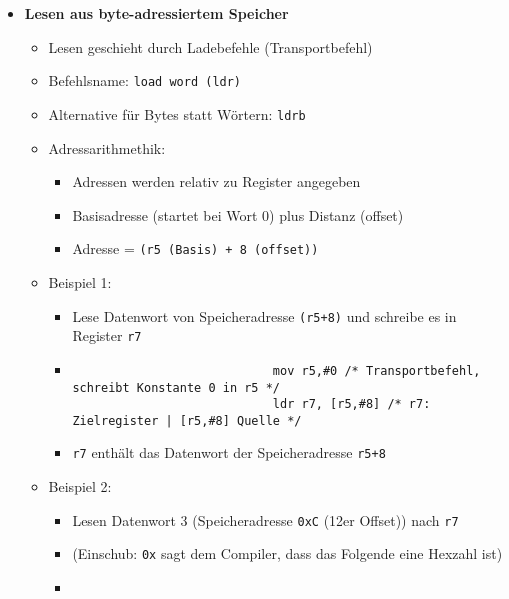 \begin{itemize}
        \item \textbf{Lesen aus byte-adressiertem Speicher}
            \begin{itemize}
                \item Lesen geschieht durch Ladebefehle (Transportbefehl)
                \item Befehlsname: \texttt{load word (ldr)}
                \item Alternative für Bytes statt Wörtern: \texttt{ldrb}
                \item Adressarithmethik: 
                \begin{itemize}
                    \item Adressen werden relativ zu Register angegeben
                    \item Basisadresse (startet bei Wort 0) plus Distanz (offset)
                    \item Adresse = \texttt{(r5 (Basis) + 8 (offset))}
                \end{itemize}
                \item Beispiel 1:
                    \begin{itemize}
                        \item Lese Datenwort von Speicheradresse \texttt{(r5+8)} und schreibe es in Register \texttt{r7}
                        \item[]
                            \begin{verbatim}
                            mov r5,#0 /* Transportbefehl, schreibt Konstante 0 in r5 */
                            ldr r7, [r5,#8] /* r7: Zielregister | [r5,#8] Quelle */
                            \end{verbatim}
                        \item \texttt{r7} enthält das Datenwort der Speicheradresse \texttt{r5+8}
                    \end{itemize}
                \item Beispiel 2:
                    \begin{itemize}
                        \item Lesen Datenwort 3 (Speicheradresse \texttt{0xC} (12er Offset)) nach \texttt{r7}
                        \item (Einschub: \texttt{0x} sagt dem Compiler, dass das Folgende eine Hexzahl ist)
                        \item[]
                            \begin{verbatim}

\end{verbatim}
\end{itemize}
\end{itemize}
\end{itemize}
